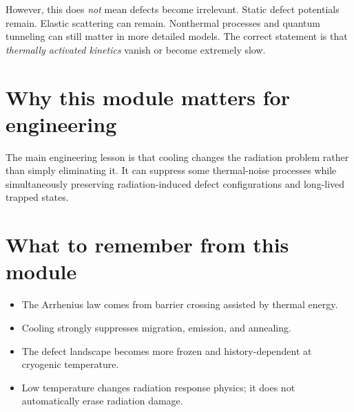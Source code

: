 \documentclass[11pt]{article}
\begin{document}
However, this does \emph{not} mean defects become irrelevant. Static defect potentials remain. Elastic scattering can remain. Nonthermal processes and quantum tunneling can still matter in more detailed models. The correct statement is that \emph{thermally activated kinetics} vanish or become extremely slow.

\section{Why this module matters for engineering}
The main engineering lesson is that cooling changes the radiation problem rather than simply eliminating it. It can suppress some thermal-noise processes while simultaneously preserving radiation-induced defect configurations and long-lived trapped states.

\section{What to remember from this module}
\begin{itemize}
    \item The Arrhenius law comes from barrier crossing assisted by thermal energy.
    \item Cooling strongly suppresses migration, emission, and annealing.
    \item The defect landscape becomes more frozen and history-dependent at cryogenic temperature.
    \item Low temperature changes radiation response physics; it does not automatically erase radiation damage.
\end{itemize}
\end{document}
